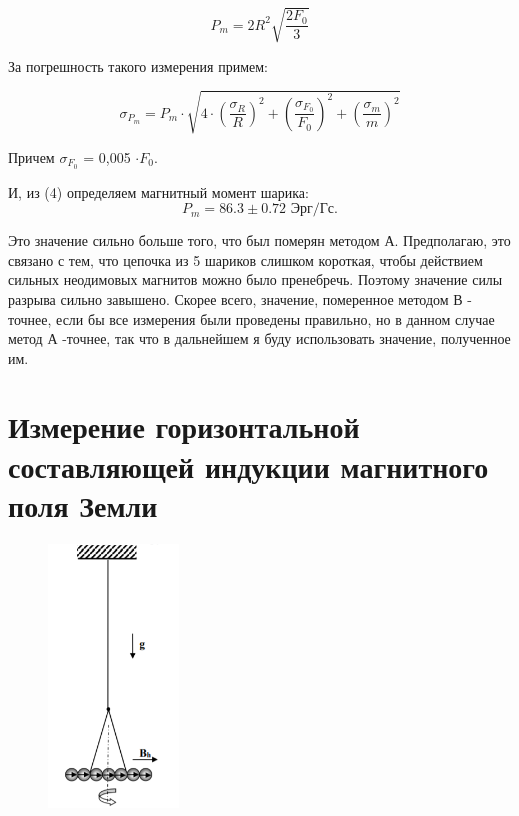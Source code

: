 \begin{equation}
P_m = 2R^2\sqrt{\frac{2F_0}{3}}
\end{equation}

За погрешность такого измерения примем:

\begin{equation}
\sigma_{P_m} = P_m\cdot \sqrt{4\cdot(\frac{\sigma_R}{R})^2 + (\frac{\sigma_{F_0}}{F_0})^2 + (\frac{\sigma_{m}}{m})^2}
\end{equation}

Причем $\sigma_{F_0}$ = 0,005 $\cdot F_0$.

И, из (4) определяем магнитный момент шарика:
\[P_m = 86.3 \pm 0.72 \text{ Эрг/Гс}.\]

Это значение сильно больше того, что был померян методом А. Предполагаю, это связано с тем, что цепочка из 5 шариков слишком короткая, чтобы действием сильных неодимовых магнитов можно было пренебречь. Поэтому значение силы разрыва сильно завышено. Скорее всего, значение, померенное методом В - точнее, если бы все измерения были проведены правильно, но в данном случае метод А -точнее, так что в дальнейшем я буду использовать значение, полученное им.

\section{Измерение горизонтальной составляющей индукции магнитного поля Земли}

\begin{figure}
\begin{center}
\includegraphics[height=7cm]{pics/krut.png}
\end{center}
\end{figure}


